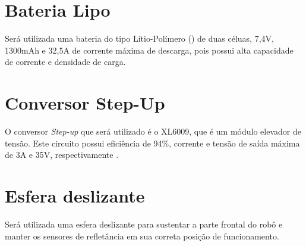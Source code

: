 \section{Bateria Lipo} \label{cap:bateria}
Será utilizada uma bateria do tipo Lítio-Polímero () de duas céluas, 7,4V, 1300mAh e 
32,5A de corrente máxima de descarga, pois possui alta capacidade de corrente e densidade de carga.
\vspace{0.5cm}

\section{Conversor Step-Up} \label{cap:stepup}
O conversor \textit{Step-up} que será utilizado é o XL6009, que é um módulo elevador de tensão. Este circuito possui 
eficiência de 94\%, corrente e tensão de saída máxima de 3A e 35V, respectivamente \cite{stepup}.
\vspace{0.5cm}




\section{Esfera deslizante} \label{cap:esfera}
Será utilizada uma esfera deslizante para sustentar a parte frontal do robô e manter os sensores de refletância em sua 
correta posição de funcionamento.
\vspace{0.5cm}













